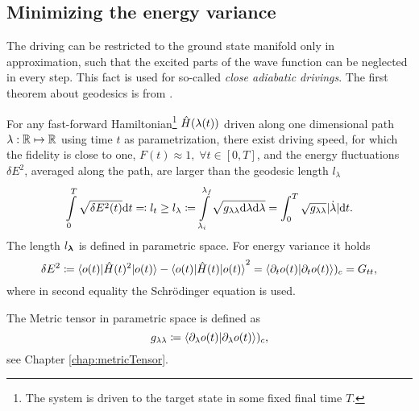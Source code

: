 






\subsection{Minimizing the energy variance}
The driving can be restricted to the ground state manifold only in approximation, such that the excited parts of the wave function can be neglected in every step. This fact is used for so-called \emph{close adiabatic drivings}. The first theorem about geodesics is from \citet{Bukov2019}.

\begin{thm}
    \label{thm:polkovnikov}
    For any fast-forward Hamiltonian\footnote{The system is driven to the target state in some fixed final time $T$.} $\hat{H}(\lambda(t))$ driven along one dimensional path $\lambda: \mathbb{R}\mapsto \mathbb{R}$ using time $t$ as parametrization, there exist driving speed, for which the fidelity is close to one, $F(t)\approx 1, \;\forall t\in[0,T]$, and the energy fluctuations $\delta E^2$, averaged along the path, are larger than the geodesic length $l_\lambda$
    \begin{equation}
        \int\limits_0^{T}\sqrt{\delta E^2(t)}\mathrm{d} t \eqqcolon l_t\geq l_\lambda \coloneqq \int\limits_{\lambda_i}^{\lambda_f} \sqrt{g_{\lambda\lambda}\mathrm{d} \lambda\mathrm{d} \lambda} =\int_0^{T} \sqrt{g_{\lambda\lambda}}|\dot \lambda|\mathrm{d} t.
    \end{equation}
    The length $l_{\bm\lambda}$ is defined in parametric space. For energy variance it holds
    \begin{equation}
        \delta E^2\coloneqq \braket{o(t)|\hat{H}(t)^2|o(t)}-\braket{o(t)|\hat{H}(t)|o(t)}^2=\braket{\partial_t  o(t)|\partial_t o(t)})_c=G_{tt},
    \end{equation}    
    where in second equality the Schr\"odinger equation is used. 
    
    The Metric tensor in parametric space is defined as
    \begin{equation}
        g_{\lambda\lambda}\coloneqq \braket{\partial_\lambda o(t)|\partial_\lambda o(t)})_c,
    \end{equation}
    see Chapter \ref{chap:metricTensor}.
\end{thm}


